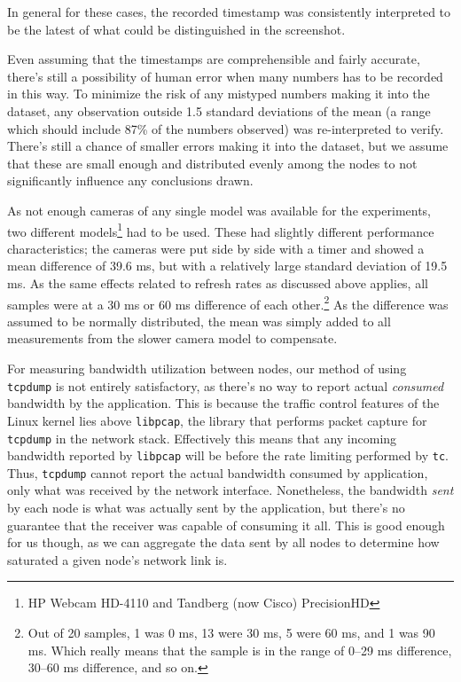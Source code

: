 In general for these cases, the recorded timestamp was consistently interpreted to be the latest of what could be distinguished in the screenshot.

Even assuming that the timestamps are comprehensible and fairly accurate, there's still a possibility of human error when many numbers has to be recorded in this way. To minimize the risk of any mistyped numbers making it into the dataset, any observation outside 1.5 standard deviations of the mean (a range which should include 87\% of the numbers observed) was re-interpreted to verify. There's still a chance of smaller errors making it into the dataset, but we assume that these are small enough and distributed evenly among the nodes to not significantly influence any conclusions drawn.

As not enough cameras of any single model was available for the experiments, two different models\footnote{HP Webcam HD-4110 and Tandberg (now Cisco) PrecisionHD} had to be used. These had slightly different performance characteristics; the cameras were put side by side with a timer and showed a mean difference of 39.6 ms, but with a relatively large standard deviation of 19.5 ms. As the same effects related to refresh rates as discussed above applies, all samples were at a 30 ms or 60 ms difference of each other.\footnote{Out of 20 samples, 1 was 0 ms, 13 were 30 ms, 5 were 60 ms, and 1 was 90 ms. Which really means that the sample is in the range of 0--29 ms difference, 30--60 ms difference, and so on.} As the difference was assumed to be normally distributed, the mean was simply added to all measurements from the slower camera model to compensate.

For measuring bandwidth utilization between nodes, our method of using \texttt{tcpdump} is not entirely satisfactory, as there's no way to report actual \emph{consumed} bandwidth by the application. This is because the traffic control features of the Linux kernel lies above \texttt{libpcap}, the library that performs packet capture for \texttt{tcpdump} in the network stack. Effectively this means that any incoming bandwidth reported by \texttt{libpcap} will be before the rate limiting performed by \texttt{tc}. Thus, \texttt{tcpdump} cannot report the actual bandwidth consumed by application, only what was received by the network interface. Nonetheless, the bandwidth \emph{sent} by each node is what was actually sent by the application, but there's no guarantee that the receiver was capable of consuming it all. This is good enough for us though, as we can aggregate the data sent by all nodes to determine how saturated a given node's network link is.

